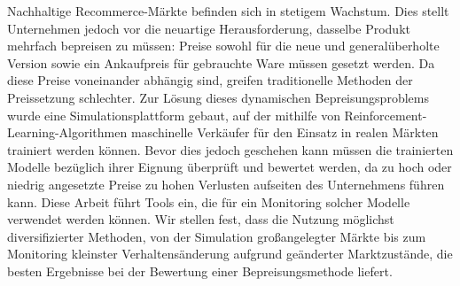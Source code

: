 Nachhaltige Recommerce-Märkte befinden sich in stetigem Wachstum. Dies stellt Unternehmen jedoch vor die neuartige Herausforderung, dasselbe Produkt mehrfach bepreisen zu müssen: Preise sowohl für die neue und generalüberholte Version sowie ein Ankaufpreis für gebrauchte Ware müssen gesetzt werden. Da diese Preise voneinander abhängig sind, greifen traditionelle Methoden der Preissetzung schlechter. Zur Lösung dieses dynamischen Bepreisungsproblems wurde eine Simulationsplattform gebaut, auf der mithilfe von Reinforcement-Learning-Algorithmen maschinelle Verkäufer für den Einsatz in realen Märkten trainiert werden können. Bevor dies jedoch geschehen kann müssen die trainierten Modelle bezüglich ihrer Eignung überprüft und bewertet werden, da zu hoch oder niedrig angesetzte Preise zu hohen Verlusten aufseiten des Unternehmens führen kann. Diese Arbeit führt Tools ein, die für ein Monitoring solcher Modelle verwendet werden können. Wir stellen fest, dass die Nutzung möglichst diversifizierter Methoden, von der Simulation großangelegter Märkte bis zum Monitoring kleinster Verhaltensänderung aufgrund geänderter Marktzustände, die besten Ergebnisse bei der Bewertung einer Bepreisungsmethode liefert.